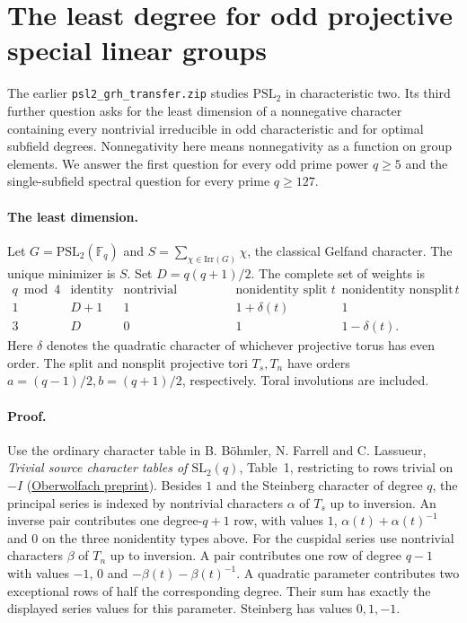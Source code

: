 \section{The least degree for odd projective special linear groups}
\label{sec:oddpsl}
The earlier \texttt{psl2\_grh\_transfer.zip} studies $\mathrm{PSL}_2$ in characteristic two. Its third further question asks for the least dimension of a nonnegative character containing every nontrivial irreducible in odd characteristic and for optimal subfield degrees. Nonnegativity here means nonnegativity as a function on group elements. We answer the first question for every odd prime power $q\ge5$ and the single-subfield spectral question for every prime $q\ge127$.

\paragraph{The least dimension.}
Let $G=\mathrm{PSL}_2(\mathbb F_q)$ and $S=\sum_{\chi\in\mathrm{Irr}(G)}\chi$, the classical Gelfand character. The unique minimizer is $S$. Set $D=q(q+1)/2$. The complete set of weights is
\[
\begin{array}{c|cccc}
q\bmod4 &\text{identity}&\text{nontrivial unipotent}
 &\text{nonidentity split }t&\text{nonidentity nonsplit }t\\ \hline
1&D+1&1&1+\delta(t)&1\\
3&D&0&1&1-\delta(t).
\end{array}
\]
Here $\delta$ denotes the quadratic character of whichever projective torus has even order. The split and nonsplit projective tori $T_s,T_n$ have orders $a=(q-1)/2,b=(q+1)/2$, respectively. Toral involutions are included.

\paragraph{Proof.}
Use the ordinary character table in B. B\"ohmler, N. Farrell and C. Lassueur, \emph{Trivial source character tables of $\mathrm{SL}_2(q)$}, Table~1, restricting to rows trivial on $-I$ (\href{https://doi.org/10.14760/OWP-2022-02}{Oberwolfach preprint}). Besides $1$ and the Steinberg character of degree $q$, the principal series is indexed by nontrivial characters $\alpha$ of $T_s$ up to inversion. An inverse pair contributes one degree-$q+1$ row, with values $1$, $\alpha(t)+\alpha(t)^{-1}$ and $0$ on the three nonidentity types above. For the cuspidal series use nontrivial characters $\beta$ of $T_n$ up to inversion. A pair contributes one row of degree $q-1$ with values $-1$, $0$ and $-\beta(t)-\beta(t)^{-1}$. A quadratic parameter contributes two exceptional rows of half the corresponding degree. Their sum has exactly the displayed series values for this parameter. Steinberg has values $0,1,-1$.

